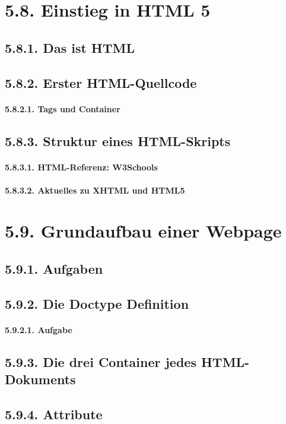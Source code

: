 \section{5.8.	Einstieg in HTML 5}
\subsection{5.8.1.	Das ist HTML}
\subsection{5.8.2.	Erster HTML-Quellcode}
\paragraph{5.8.2.1.	Tags und Container}
\subsection{5.8.3.	Struktur eines HTML-Skripts}
\paragraph{5.8.3.1.	HTML-Referenz: W3Schools}
\paragraph{5.8.3.2.	Aktuelles zu XHTML und HTML5}
\section{5.9.	Grundaufbau einer Webpage}
\subsection{5.9.1.	Aufgaben}
\subsection{5.9.2.	Die Doctype Definition}
\paragraph{5.9.2.1.	Aufgabe}
\subsection{5.9.3.	Die drei Container jedes HTML-Dokuments}
\subsection{5.9.4.	Attribute}
